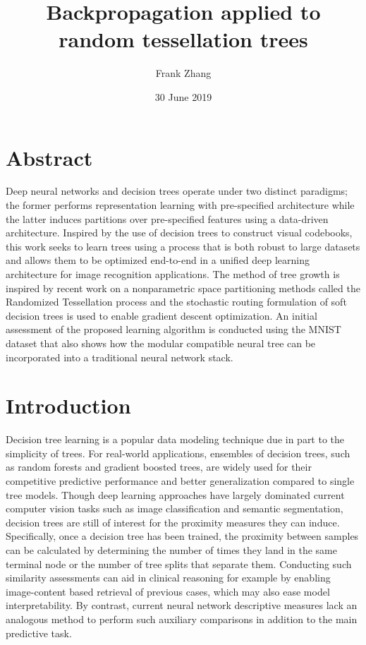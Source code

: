\documentclass[a4paper,11pt,final]{article}
\title{Backpropagation applied to random tessellation trees}
\author{Frank Zhang}
\date{30 June 2019}
\begin{document}
\maketitle

\section{Abstract}

Deep neural networks and decision trees operate under two distinct paradigms; the former performs representation learning with pre-specified architecture while the latter induces partitions over pre-specified features using a data-driven architecture. Inspired by the use of decision trees to construct visual codebooks, this work seeks to learn trees using a process that is both robust to large datasets and allows them to be optimized end-to-end in a unified deep learning architecture for image recognition applications. The method of tree growth is inspired by recent work on a nonparametric space partitioning methods called the Randomized Tessellation process and the stochastic routing formulation of soft decision trees is used to enable gradient descent optimization. An initial assessment of the proposed learning algorithm is conducted using the MNIST dataset that also shows how the modular compatible neural tree can be incorporated into a traditional neural network stack.

\section{Introduction}

Decision tree learning is a popular data modeling technique due in part to the simplicity of trees. For real-world applications, ensembles of decision trees, such as random forests and gradient boosted trees, are widely used for their competitive predictive performance and better generalization compared to single tree models. Though deep learning approaches have largely dominated current computer vision tasks such as image classification and semantic segmentation, decision trees are still of interest for the proximity measures they can induce. Specifically, once a decision tree has been trained, the proximity between samples can be calculated by determining the number of times they land in the same terminal node or the number of tree splits that separate them. Conducting such similarity assessments can aid in clinical reasoning for example by enabling image-content based retrieval of previous cases, which may also ease model interpretability. By contrast, current neural network descriptive measures lack an analogous method to perform such auxiliary comparisons in addition to the main predictive task.
\end{document}
